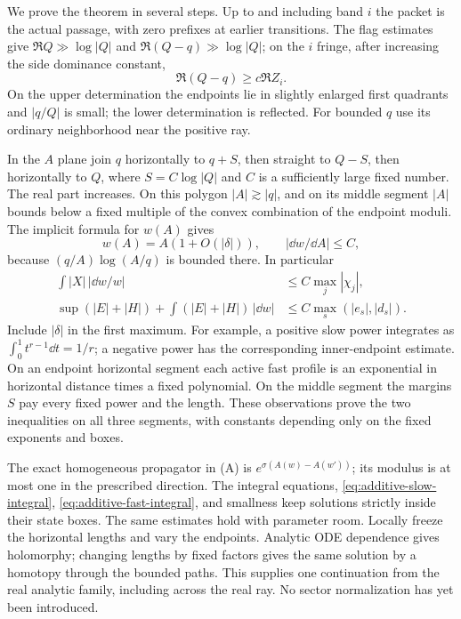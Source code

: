 We prove the theorem in several steps.  Up to and including band $i$ the
packet is the actual passage, with zero prefixes at earlier transitions.
The flag estimates give $\Re Q\gg\log|Q|$ and
$\Re(Q-q)\gg\log|Q|$; on the $i$ fringe, after increasing the side
dominance constant,
\begin{equation}\label{eq:additive-charge-realpart}
 \Re(Q-q)\ge c\Re Z_i.
\end{equation}
On the upper determination the endpoints lie in slightly enlarged first
quadrants and $|q/Q|$ is small; the lower determination is reflected.
For bounded $q$ use its ordinary neighborhood near the positive ray.

In the $A$ plane join $q$ horizontally to $q+S$, then straight to $Q-S$,
then horizontally to $Q$, where $S=C\log|Q|$ and $C$ is a sufficiently
large fixed number.  The real part increases.  On this polygon
$|A|\gtrsim|q|$, and on its middle segment $|A|$ bounds below a fixed
multiple of the convex combination of the endpoint moduli.  The implicit
formula for $w(A)$ gives
\[
 w(A)=A(1+O(|\delta|)),\qquad |\dd w/\dd A|\le C,
\]
because $(q/A)\log(A/q)$ is bounded there.  In particular
\begin{align}
 \int |X|\,|\dd w/w|&\le C\max_j|\chi_j|,
       \label{eq:additive-slow-integral}\\
 \sup(|E|+|H|)+\int(|E|+|H|)\,|\dd w|
       &\le C\max_s(|e_s|,|d_s|).\label{eq:additive-fast-integral}
\end{align}
Include $|\delta|$ in the first maximum.  For example, a positive slow
power integrates as $\int_0^1 t^{r-1}\dd t=1/r$; a negative power has
the corresponding inner-endpoint estimate.  On an endpoint horizontal
segment each active fast profile is an exponential in horizontal
distance times a fixed polynomial.  On the middle segment the margins
$S$ pay every fixed power and the length.  These observations prove the
two inequalities on all three segments, with constants depending only
on the fixed exponents and boxes.

The exact homogeneous propagator in (A) is
$e^{\sigma(A(w)-A(w'))}$; its modulus is at most one in the prescribed
direction.  The integral equations, \eqref{eq:additive-slow-integral},
\eqref{eq:additive-fast-integral}, and smallness keep solutions strictly
inside their state boxes.  The same estimates hold with parameter room.
Locally freeze the horizontal lengths and vary the endpoints.  Analytic
ODE dependence gives holomorphy; changing lengths by fixed factors gives
the same solution by a homotopy through the bounded paths.  This supplies
one continuation from the real analytic family, including across the
real ray.  No sector normalization has yet been introduced.

